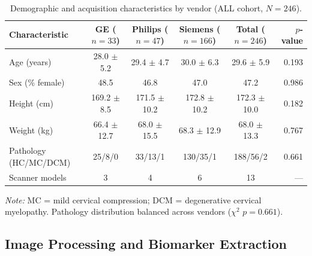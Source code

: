 \documentclass[12pt,a4paper]{article}
\begin{document}
\begin{table}[H]
\centering
\caption{Demographic and acquisition characteristics by vendor (ALL cohort, $N=246$).}
\label{tab:demographics_all}
\begin{tabular}{lccccr}
\toprule
\textbf{Characteristic} & \textbf{GE ($n=33$)} & \textbf{Philips ($n=47$)} & \textbf{Siemens ($n=166$)} & \textbf{Total ($n=246$)} & \textbf{$p$-value} \\
\midrule
Age (years)       & 28.0 $\pm$ 5.2 & 29.4 $\pm$ 4.7 & 30.0 $\pm$ 6.3 & 29.6 $\pm$ 5.9  & 0.193 \\
Sex (\% female)    & 48.5           & 46.8           & 47.0           & 47.2             & 0.986 \\
Height (cm)        & 169.2 $\pm$ 8.5 & 171.5 $\pm$ 10.2 & 172.8 $\pm$ 10.2 & 172.3 $\pm$ 10.0  & 0.182 \\
Weight (kg)        & 66.4 $\pm$ 12.7 & 68.0 $\pm$ 15.5 & 68.3 $\pm$ 12.9 & 68.0 $\pm$ 13.3  & 0.767 \\
Pathology (HC/MC/DCM) & 25/8/0 & 33/13/1 & 130/35/1 & 188/56/2 & 0.661 \\
Scanner models     & 3              & 4              & 6              & 13               & --- \\
\bottomrule
\end{tabular}
\vspace{4pt}
\par\small\textit{Note:} MC = mild cervical compression; DCM = degenerative cervical myelopathy. Pathology distribution balanced across vendors ($\chi^2$ $p = 0.661$).
\end{table}

\subsection{Image Processing and Biomarker Extraction}
\end{document}
